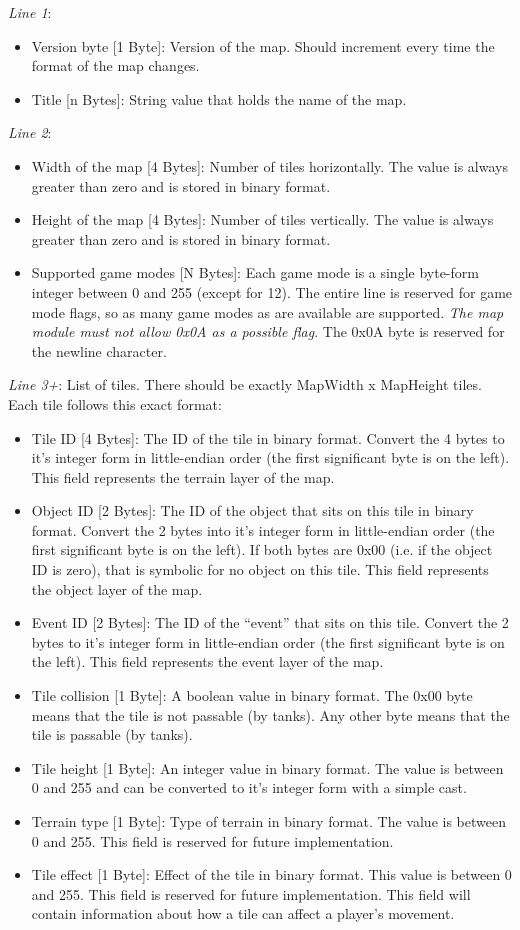 \emph{Line 1}: 
\begin{itemize}
	\item Version byte [1 Byte]: Version of the map. Should increment every time the format of the map changes.
	\item Title [n Bytes]: String value that holds the name of the map.
\end{itemize}
\emph{Line 2}: 
\begin{itemize}
	\item Width of the map [4 Bytes]: Number of tiles horizontally. The value is always greater than zero and is stored in binary format.
	\item Height of the map [4 Bytes]: Number of tiles vertically. The value is always greater than zero and is stored in binary format.
	\item Supported game modes [N Bytes]: Each game mode is a single byte-form integer between 0 and 255 (except for 12). The entire line is reserved for game mode flags, so as many game modes as are available are supported. \emph{The map module must not allow 0x0A as a possible flag}. The 0x0A byte is reserved for the newline character.
\end{itemize}
\emph{Line 3+}: List of tiles. There should be exactly MapWidth x MapHeight tiles. Each tile follows this exact format:
\begin{itemize}
	\item Tile ID [4 Bytes]: The ID of the tile in binary format. Convert the 4 bytes to it's integer form in little-endian order (the first significant byte is on the left). This field represents the terrain layer of the map.
	\item Object ID [2 Bytes]: The ID of the object that sits on this tile in binary format. Convert the 2 bytes into it's integer form in little-endian order (the first significant byte is on the left). If both bytes are 0x00 (i.e. if the object ID is zero), that is symbolic for no object on this tile. This field represents the object layer of the map.
	\item Event ID [2 Bytes]: The ID of the ``event'' that sits on this tile. Convert the 2 bytes to it's integer form in little-endian order (the first significant byte is on the left). This field represents the event layer of the map.
	\item Tile collision [1 Byte]: A boolean value in binary format. The 0x00 byte means that the tile is not passable (by tanks). Any other byte means that the tile is passable (by tanks).
	\item Tile height [1 Byte]: An integer value in binary format. The value is between 0 and 255 and can be converted to it's integer form with a simple cast.
	\item Terrain type [1 Byte]: Type of terrain in binary format. The value is between 0 and 255. This field is reserved for future implementation.
	\item Tile effect [1 Byte]: Effect of the tile in binary format. This value is between 0 and 255. This field is reserved for future implementation. This field will contain information about how a tile can affect a player's movement.
\end{itemize}

